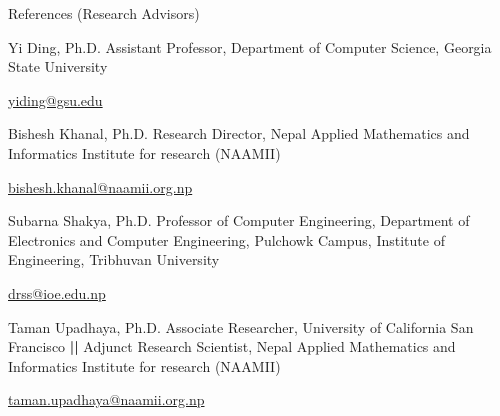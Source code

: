 \documentclass[]{kyvernitis-resume}
\begin{document}


\begin{section}{References (Research Advisors)}
    \begin{subsectionnobullet}
        {Yi Ding, Ph.D.}{ {\normalfont Assistant Professor,} Department of Computer Science, Georgia State University}{}{}
        \item{\href{mailto:yiding@gsu.edu}{\ttfamily yiding@gsu.edu}}
    \end{subsectionnobullet}
    \begin{subsectionnobullet}
        {Bishesh Khanal, Ph.D.}{ {\normalfont Research Director,} Nepal Applied Mathematics and Informatics Institute for research (NAAMII)}{}{}
        \item{\href{mailto:bishesh.khanal@naamii.org.np}{ \ttfamily bishesh.khanal@naamii.org.np}}
    \end{subsectionnobullet}
    \begin{subsectionnobullet}
        {Subarna Shakya, Ph.D.}{ { \normalfont Professor of Computer Engineering,} Department of Electronics and Computer Engineering, Pulchowk Campus, Institute of Engineering, Tribhuvan University}{}{}
        \item{ \href{mailto:drss@ioe.edu.np}{ \ttfamily drss@ioe.edu.np}}
    \end{subsectionnobullet}
    \begin{subsectionnobullet}
        {Taman Upadhaya, Ph.D.}{ {\normalfont Associate Researcher,} University of California San Francisco {\normalfont \textbf{||} Adjunct Research Scientist,} Nepal Applied Mathematics and Informatics Institute for research (NAAMII)}{}{}
        \item{\href{mailto:taman.upadhaya@naamii.org.np}{\ttfamily taman.upadhaya@naamii.org.np}}
    \end{subsectionnobullet}

\end{section}
\end{document}
